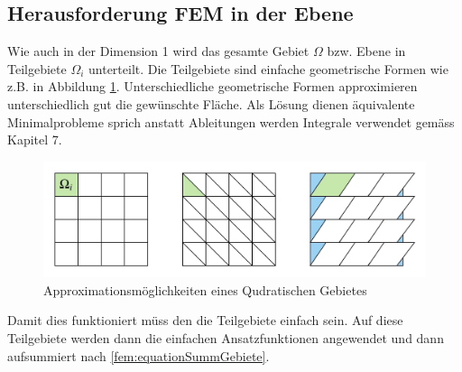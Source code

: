 \subsection{Herausforderung FEM in der Ebene}
Wie auch in der Dimension 1 wird das gesamte Gebiet $\Omega$ bzw. Ebene in Teilgebiete $\Omega_i$ unterteilt. Die Teilgebiete sind einfache geometrische Formen wie z.B. in Abbildung \ref{fig:Figuren}. Unterschiedliche geometrische Formen approximieren unterschiedlich gut die gewünschte Fläche. Als Lösung dienen äquivalente Minimalprobleme sprich anstatt Ableitungen werden Integrale verwendet gemäss Kapitel 7.
\begin{figure}[h!]
	\centering
	\includegraphics[scale=0.6]{papers/fem/Images/Figuren.jpeg}
	\caption{Approximationsmöglichkeiten eines Qudratischen Gebietes}
	\label{fig:Figuren}
\end{figure}
Damit dies funktioniert müss den die Teilgebiete einfach sein. Auf diese Teilgebiete werden dann die einfachen Ansatzfunktionen angewendet und dann aufsummiert nach \eqref{fem:equationSummGebiete}.

